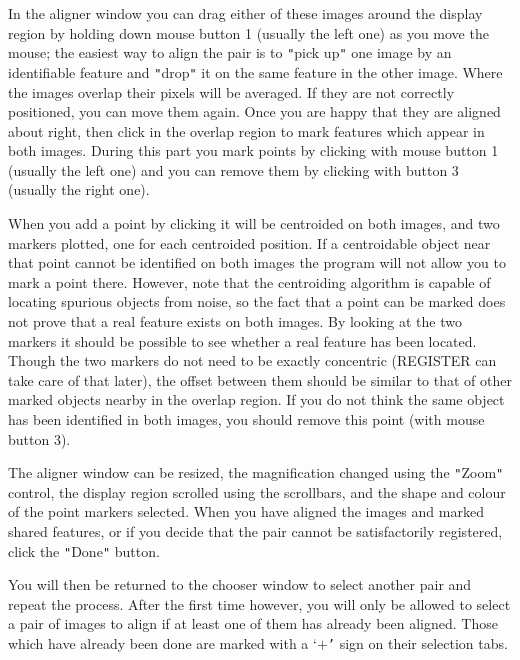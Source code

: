 \documentclass[twoside,11pt]{article}
\newcommand{\htmlref}[2]{#1}
\renewcommand{\_}{\texttt{\symbol{95}}}
\newcommand{\xroutine}[1]{\htmlref{{\sc #1}}{#1}}
\begin{document}
{{      In the aligner window you can drag either of these images around
      the display region by holding down mouse button 1 (usually the
      left one) as you move the mouse; the easiest way to align the pair
      is to {\tt "}pick up{\tt "} one image by an identifiable feature and {\tt "}drop{\tt "} it
      on the same feature in the other image.  Where the images overlap
      their pixels will be averaged.  If they are not correctly
      positioned, you can move them again.  Once you are happy that
      they are aligned about right, then click in the overlap region
      to mark features which appear in both images.  During this
      part you mark points by clicking with mouse button 1 (usually
      the left one) and you can remove them by clicking with button 3
      (usually the right one).
 
      When you add a point by clicking it will be centroided on both
      images, and two markers plotted, one for each centroided position.
      If a centroidable object near that point cannot be identified
      on both images the program will not allow you to mark a point
      there.  However, note that the centroiding algorithm is
      capable of locating spurious objects from noise, so the fact
      that a point can be marked does not prove that a real
      feature exists on both images.  By looking at the two markers
      it should be possible to see whether a real feature has been
      located.  Though the two markers do not need to be exactly
      concentric (\xroutine{REGISTER} can take care of that later), the offset
      between them should be similar to that of other marked objects
      nearby in the overlap region.  If you do not think the same
      object has been identified in both images, you should remove
      this point (with mouse button 3).
 
      The aligner window can be resized, the magnification changed
      using the {\tt "}Zoom{\tt "} control, the display region scrolled using
      the scrollbars, and the shape and colour of the point markers
      selected.  When you have aligned the images and marked shared
      features, or if you decide that the pair cannot be satisfactorily
      registered, click the {\tt "}Done{\tt "} button.

      You will then be returned to the chooser window to select another
      pair and repeat the process.  After the first time however,
      you will only be allowed to select a pair of images to align
      if at least one of them has already been aligned.  Those
      which have already been done are marked with a `$+${\tt '} sign on their
      selection tabs.

}}
\end{document}
